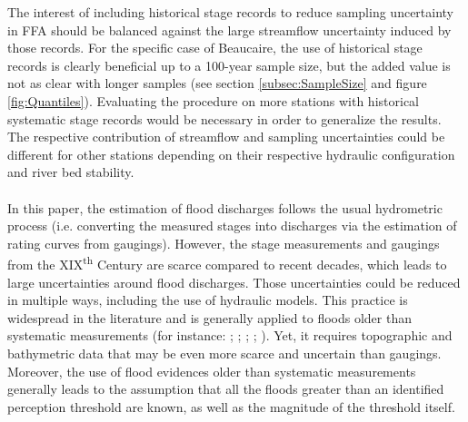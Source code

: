     The interest of including historical stage records to reduce sampling uncertainty in FFA should be balanced against the large streamflow uncertainty induced by those records. For the specific case of Beaucaire, the use of historical stage records is clearly beneficial up to a 100-year sample size, but the added value is not as clear with longer samples (see section \ref{subsec:SampleSize} and figure \ref{fig:Quantiles}). Evaluating the procedure on more stations with historical systematic stage records would be necessary in order to generalize the results. The respective contribution of streamflow and sampling uncertainties could be different for other stations depending on their respective hydraulic configuration and river bed stability.    
    \paragraph{}
    In this paper, the estimation of flood discharges follows the usual hydrometric process (i.e. converting the measured stages into discharges via the estimation of rating curves from gaugings). However, the stage measurements and gaugings from the XIX\textsuperscript{th} Century are scarce compared to recent decades, which leads to large uncertainties around flood discharges. Those uncertainties could be reduced in multiple ways, including the use of hydraulic models. This practice is widespread in the literature and is generally applied to floods older than systematic measurements (for instance: \citet{naulet_flood_2005}; \citet{neppel_flood_2010}; \citet{machado_flood_2015}; \citet{ruiz-bellet_uncertainty_2017}; \citet{van_der_meulen_late_2021}). Yet, it requires topographic and bathymetric data that may be even more scarce and uncertain than gaugings. Moreover, the use of flood evidences older than systematic measurements generally leads to the assumption that all the floods greater than an identified perception threshold are known, as well as the magnitude of the threshold itself.
    
